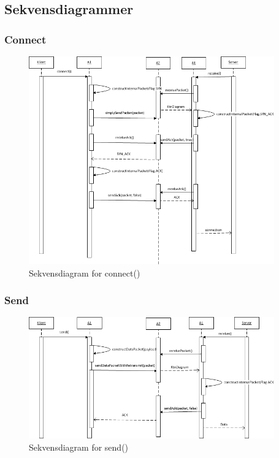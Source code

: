 \subsection{Sekvensdiagrammer}
\subsubsection{Connect}
\begin{figure}[H]
\label{fig:conSEQ}
\includegraphics[width=400px]{connectSEQ.png}
\caption{Sekvensdiagram for connect()}
\end{figure}

\subsubsection{Send}
\begin{figure}[H]
\label{fig:sendSEQ}
\includegraphics[width=400px]{sendSEQ.png}
\caption{Sekvensdiagram for send()}
\end{figure}

